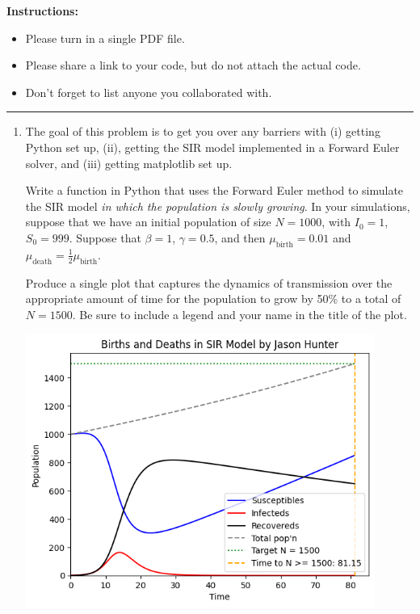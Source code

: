 \documentclass[11pt]{article}
\begin{document}
\renewcommand{\headrulewidth}{0.4pt}

{\bf Instructions:} 
\begin{itemize}[itemsep=-7pt]
	\item Please turn in a single PDF file.
	\item Please share a link to your code, but do not attach the actual code. 
	\item Don't forget to list anyone you collaborated with. 
\end{itemize}
\vspace{0.1in}\hrule

\begin{enumerate}

\item The goal of this problem is to get you over any barriers with (i) getting Python set up, (ii), getting the SIR model implemented in a Forward Euler solver, and (iii) getting matplotlib set up.
	
	Write a function in Python that uses the Forward Euler method to simulate the SIR model {\it in which the population is slowly growing}.
	In your simulations, suppose that we have an initial population of size $N=1000$, with $I_0=1$, $S_0=999$. Suppose that $\beta=1$, $\gamma=0.5$, and then $\mu_{\text{birth}}=0.01$ and $\mu_{\text{death}} = \tfrac{1}{2} \mu_\text{birth}$. 
	
	Produce a single plot that captures the dynamics of transmission over the appropriate amount of time for the population to grow by 50\% to a total of $N=1500$. Be sure to include a legend and your name in the title of the plot.
	
\begin{center}
  \includegraphics[width=0.9\textwidth, height=0.6\textheight, keepaspectratio]{births-and-deaths.png}
\end{center}


\end{enumerate}
\end{document}
